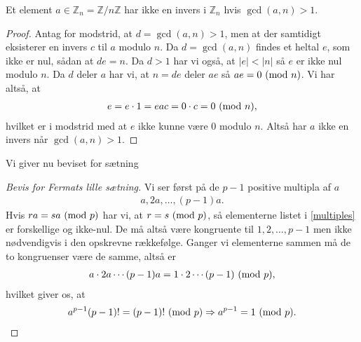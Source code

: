\begin{proposition}
\label{inverse_exists_not}
Et element $a \in \mathbb{Z}_n = \mathbb{Z}/n\mathbb{Z}$ har ikke en invers i $\mathbb{Z}_n$ hvis $\gcd(a, n) > 1$. 
\end{proposition}
\begin{proof}
Antag for modstrid, at $d = \gcd(a, n) > 1$, men at der samtidigt eksisterer en invers $c$ til $a$ modulo $n$. Da $d = \gcd(a, n)$ findes et heltal $e$, som ikke er nul, sådan at $de = n$. Da $d >1$ har vi også, at $|e| < |n|$ så $e$ er ikke nul modulo $n$. Da $d$ deler $a$ har vi, at $n = de$ deler $ae$ så $ae = 0 \ (\mathrm{mod} \ n)$. Vi har altså, at
\begin{align*}
	e = e \cdot 1 = eac = 0 \cdot c = 0 \ (\mathrm{mod} \ n),
\end{align*}
hvilket er i modstrid med at $e$ ikke kunne være $0$ modulo $n$. Altså har $a$ ikke en invers når $\gcd(a, n) > 1$.
\end{proof}

Vi giver nu beviset for sætning 
\begin{proof}[Bevis for Fermats lille sætning]
Vi ser først på de $p-1$ positive multipla af $a$
\begin{align}
	\label{multiples}
	a, 2a, \ldots, (p-1)a.
\end{align}
Hvis $ra = sa \ (\mathrm{mod} \ p)$ har vi, at $r = s \ (\mathrm{mod} \ p)$, så elementerne listet i \eqref{multiples} er forskellige og ikke-nul. De må altså være kongruente til $1, 2, \ldots, p-1$ men ikke nødvendigvis i den opskrevne rækkefølge. Ganger vi elementerne sammen må de to kongruenser være de samme, altså er
\begin{align*}
	a \cdot 2a \cdots (p-1)a = 1 \cdot 2 \cdots (p-1) \ (\mathrm{mod} \ p),
\end{align*}
hvilket giver os, at 
\begin{align*}
	a^{p-1} (p-1)! = (p-1)! \ (\mathrm{mod} \ p) \Rightarrow a^{p-1} = 1 \ (\mathrm{mod} \ p).
\end{align*}


\end{proof}